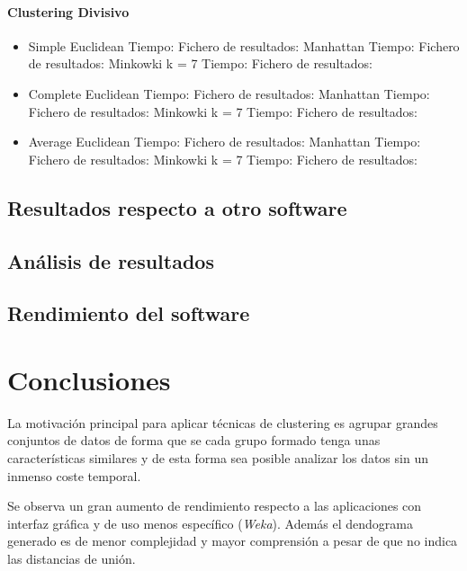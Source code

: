 \documentclass[11pt, titlepage,a4paper]{article}
\begin{document}
\paragraph{Clustering Divisivo\\}
\begin{itemize}
  \item Simple
  	\subitem Euclidean
  		\subsubitem Tiempo: 
  		\subsubitem Fichero de resultados: 
	\subitem Manhattan
		\subsubitem Tiempo: 
  		\subsubitem Fichero de resultados: 
	\subitem Minkowki k = 7
		\subsubitem Tiempo: 
  		\subsubitem Fichero de resultados: 	
  \item Complete
	\subitem Euclidean
  		\subsubitem Tiempo: 
  		\subsubitem Fichero de resultados: 
	\subitem Manhattan
		\subsubitem Tiempo: 
  		\subsubitem Fichero de resultados: 
	\subitem Minkowki k = 7
		\subsubitem Tiempo: 
  		\subsubitem Fichero de resultados: 	
  \item Average
  	\subitem Euclidean
  		\subsubitem Tiempo: 
  		\subsubitem Fichero de resultados: 
	\subitem Manhattan
		\subsubitem Tiempo: 
  		\subsubitem Fichero de resultados: 
	\subitem Minkowki k = 7
		\subsubitem Tiempo: 
  		\subsubitem Fichero de resultados: 	
\end{itemize}

\subsection{Resultados respecto a otro software}

\subsection{Análisis de resultados}

\subsection{Rendimiento del software}

\section{Conclusiones}
La motivación principal para aplicar técnicas de clustering es agrupar grandes
conjuntos de datos de forma que se cada grupo formado tenga unas características similares y de esta forma sea posible analizar los datos sin un inmenso coste temporal.

Se observa un gran aumento de rendimiento respecto a las aplicaciones con
interfaz gráfica y de uso menos específico (\textit{Weka}). Además el dendograma generado es de menor complejidad y mayor comprensión a pesar de que no indica las distancias de unión.
\end{document}
